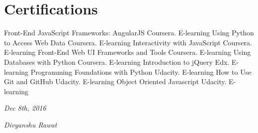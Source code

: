 \documentclass[]{friggeri-cv}
\begin{document}
\section{Certifications}
\begin{entrylist}
  \entry
    {}
    {Front-End JavaScript Frameworks: AngularJS}
    {Coursera. E-learning}
    {}
    \entry
    {}
    {Using Python to Access Web Data}
    {Coursera. E-learning}
    {}
    \entry
    {}
    {Interactivity with JavaScript}
    {Coursera. E-learning}
    {}
    \entry
    {}
    {Front-End Web UI Frameworks and Tools}
    {Coursera. E-learning}
    {}
    {}
    \entry
    {}
    {Using Databases with Python}
    {Coursera. E-learning}
    {}
    \entry
    {}
    {Introduction to jQuery}
    {Edx. E-learning}
    {}
     \entry
    {}
    {Programming Foundations with Python}
    {Udacity. E-learning}
    {}
     \entry
    {}
    {How to Use Git and GitHub}
    {Udacity. E-learning}
    {}
     \entry
    {}
    {Object Oriented Javascript}
    {Udacity. E-learning}
    {}
    
\end{entrylist}

\begin{flushleft}
\emph{Dec 8th, 2016}
\end{flushleft}
\begin{flushright}
\emph{Divyanshu Rawat}
\end{flushright}
\end{document}
